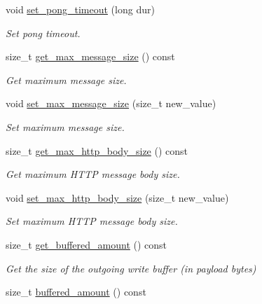 \begin{DoxyCompactItemize}
void \hyperlink{classwebsocketpp_1_1connection_ab9a905ac6a4f0f8546011b8f8a531563}{set\+\_\+pong\+\_\+timeout} (long dur)
\begin{DoxyCompactList}\small\item\em Set pong timeout. \end{DoxyCompactList}\item 
size\+\_\+t \hyperlink{classwebsocketpp_1_1connection_af7739a5097ae6562bc9b0880731a2857}{get\+\_\+max\+\_\+message\+\_\+size} () const
\begin{DoxyCompactList}\small\item\em Get maximum message size. \end{DoxyCompactList}\item 
void \hyperlink{classwebsocketpp_1_1connection_a522286bf83373f87ddebf93b732abffc}{set\+\_\+max\+\_\+message\+\_\+size} (size\+\_\+t new\+\_\+value)
\begin{DoxyCompactList}\small\item\em Set maximum message size. \end{DoxyCompactList}\item 
size\+\_\+t \hyperlink{classwebsocketpp_1_1connection_a9a050215a9f1d7652bcd8c543ae5f38c}{get\+\_\+max\+\_\+http\+\_\+body\+\_\+size} () const
\begin{DoxyCompactList}\small\item\em Get maximum H\+T\+TP message body size. \end{DoxyCompactList}\item 
void \hyperlink{classwebsocketpp_1_1connection_ad2a5b06ad88f5bcdd06fcabaae3323bc}{set\+\_\+max\+\_\+http\+\_\+body\+\_\+size} (size\+\_\+t new\+\_\+value)
\begin{DoxyCompactList}\small\item\em Set maximum H\+T\+TP message body size. \end{DoxyCompactList}\item 
size\+\_\+t \hyperlink{classwebsocketpp_1_1connection_a41a23575fcdad7f8afe25b2fabe12593}{get\+\_\+buffered\+\_\+amount} () const
\begin{DoxyCompactList}\small\item\em Get the size of the outgoing write buffer (in payload bytes) \end{DoxyCompactList}\item 
size\+\_\+t \hyperlink{classwebsocketpp_1_1connection_aaaad6dc1c81fc944593f529575b67d96}{buffered\+\_\+amount} () const\hypertarget{classwebsocketpp_1_1connection_aaaad6dc1c81fc944593f529575b67d96}{}\label{classwebsocketpp_1_1connection_aaaad6dc1c81fc944593f529575b67d96}


\end{DoxyCompactItemize}
